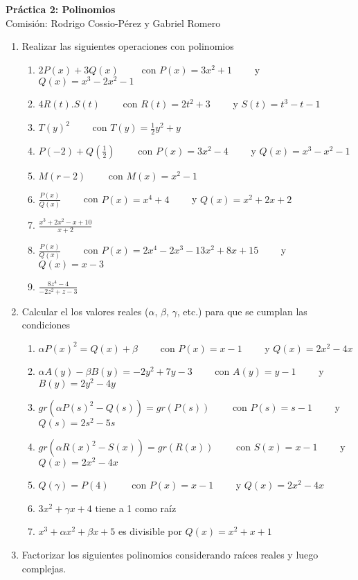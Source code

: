 \documentclass[a4paper]{article}
\newcommand{\exercise}{\item}
\newcommand{\df}[2]{\displaystyle\frac{#1}{#2}}
\begin{document}
\noindent \hrulefill 
\vspace{-7pt}
\begin{center} 
	\textbf{ Práctica 2: Polinomios } \\
	Comisión: Rodrigo Cossio-Pérez y Gabriel Romero
\end{center}
\vspace{-10pt}
\hrulefill
\begin{enumerate}
	\exercise Realizar las siguientes operaciones con polinomios
	\begin{enumerate} [label=(\alph*)]
		\item $2P(x)+3Q(x)$ ~~~~con $P(x)=3x^2+1$ ~~~~y $Q(x)=x^3-2x^2-1$
		\item $4R(t).S(t)$ ~~~~con $R(t)=2t^2+3$ ~~~~y $S(t)=t^3-t-1$
		\item $T(y)^2$ ~~~~con $T(y)=\df{1}{2}y^2+y$
		\item $P(-2)+Q\left(\df{1}{2}\right)$ ~~~~con $P(x)=3x^2-4$ ~~~~y $Q(x)=x^3-x^2-1$
		\item $M(r-2)$ ~~~~con $M(x)=x^2-1$
		\item $\df{P(x)}{Q(x)}$ ~~~~con $P(x)=x^4+4$ ~~~~y $Q(x)=x^2+2x+2$
		\item $\df{x^3+2x^2-x+10}{x+2}$
		\item $\df{P(x)}{Q(x)}$ ~~~~con $P(x)=2x^4-2x^3-13x^2+8x+15$ ~~~~y $Q(x)=x-3$
		\item $\df{8z^4-4}{-2z^2+z-3}$
	\end{enumerate}
	\exercise Calcular el los valores reales ($\alpha$, $\beta$, $\gamma$, etc.) para que se cumplan las condiciones
	\begin{enumerate} [label=(\alph*)]
		\item $\alpha P(x)^2 = Q(x) +\beta$ ~~~~con $P(x)=x-1$ ~~~~y $Q(x)=2x^2-4x$
		\item $\alpha A(y)-\beta B(y) = -2y^2 +7y-3$ ~~~~con $A(y)=y-1$ ~~~~y $B(y)=2y^2-4y$
		\item $gr\left(\alpha P(s)^2 - Q(s)\right)=gr\left(P(s)\right)$ ~~~~con $P(s)=s-1$ ~~~~y $Q(s)=2s^2-5s$
		\item $gr\left(\alpha R(x)^2 - S(x)\right)=gr\left(R(x)\right)$ ~~~~con $S(x)=x-1$ ~~~~y $Q(x)=2x^2-4x$
		\item $Q(\gamma)=P(4)$ ~~~~con $P(x)=x-1$ ~~~~y $Q(x)=2x^2-4x$
		\item $3x^2+\gamma x+4$ tiene a 1 como raíz
		\item $x^3+\alpha x^2+\beta x+5$ es divisible por $Q(x)=x^2+x+1$
	\end{enumerate}
	\exercise Factorizar los siguientes polinomios considerando raíces reales y luego complejas.

\end{enumerate}
\end{document}
